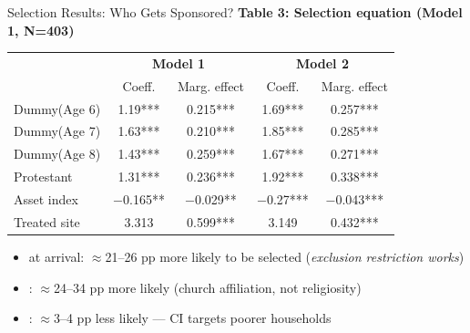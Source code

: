 \documentclass[aspectratio=169, 10pt]{beamer}
\begin{document}
\begin{frame}{Selection Results: Who Gets Sponsored?}
  \textbf{Table 3: Selection equation (Model 1, N=403)}
  \begin{center}
  \begin{tabular}{lcccc}
    \toprule
    & \multicolumn{2}{c}{\textbf{Model 1}} & \multicolumn{2}{c}{\textbf{Model 2}} \\
    & Coeff. & Marg. effect & Coeff. & Marg. effect \\
    \midrule
    Dummy(Age 6) & 1.19*** & 0.215*** & 1.69*** & 0.257*** \\
    Dummy(Age 7) & 1.63*** & 0.210*** & 1.85*** & 0.285*** \\
    Dummy(Age 8) & 1.43*** & 0.259*** & 1.67*** & 0.271*** \\
    Protestant    & 1.31*** & 0.236*** & 1.92*** & 0.338*** \\
    Asset index   & $-$0.165** & $-$0.029** & $-$0.27*** & $-$0.043*** \\
    Treated site  & 3.313 & 0.599*** & 3.149 & 0.432*** \\
    \bottomrule
  \end{tabular}
  \end{center}
  \vspace{0.3em}
  \begin{itemize}
    \item {} at arrival: $\approx$21--26 pp more likely to be selected (\textit{exclusion restriction works})
    \item {}: $\approx$24--34 pp more likely (church affiliation, not religiosity)
    \item {}: $\approx$3--4 pp less likely — CI targets poorer households
  \end{itemize}
\end{frame}
\end{document}
